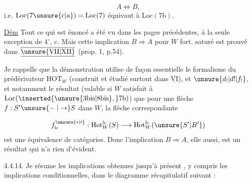 \[
 A\Longleftrightarrow B,
\]
i.e. $\mathrm{Loc}(7\unsure{\mathrm c|\mathrm a})=\mathrm{Loc}(7)$  équivaut à $\mathrm{Loc}(7\mathrm b)$.


\uline{Dém}  Tout ce qui est énoncé a été vu dans les pages précédentes, à la seule exception de $4^\circ$, c. Mais cette implication $B\Rightarrow A$ pour $W$ fort. saturé est prouvé dans $\underline{\overline{\unsure{\mathrm{VII}|\mathrm{XII}}}}$ (prop. 1, p.54).

Je rappelle que la démonstration utilise de façon essentielle le formalisme du  prédérivateur $\mathrm{HOT}_W$ (construit et étudié surtout dans $\underline{\overline{\mathrm{VI}}}$), et   $\unsure{d_!|d!|f_!}$, et notamment le résultat (valable si $W$ satisfait à $\mathrm{Loc}(\inserted{\unsure{3\mathrm{bis}|8\mathrm{bis}},}7\mathrm b)$) que pour une flèche $f:S'\unsure{\mathrel{-}|\to} S$ dans $W$, la flèche correspondante

\[
 f^{\unsure{*|\prime}}_{\mathrm{lc}}:\mathrm{Hot}^{\mathrm{lc}}_W(S)\longrightarrow\mathrm{Hot}^{\mathrm{lc}}_W(\unsure{S'|B'})
\]
est une équivalence de catégories. Donc l'implication $B\Rightarrow A$, elle aussi, est un résultat qui n'a rien d'évident.


4.4.14. Je résume les implications obtenues jusqu'à présent , y compris les implications conditionnelles, dans le diagramme récapitulatif suivant :

